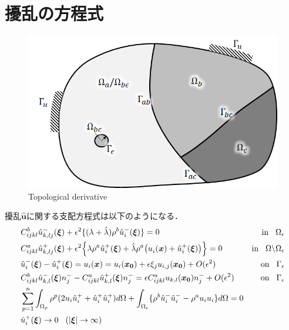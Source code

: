 \section{擾乱の方程式}

\begin{figure}[ht]
	\begin{center}
		\includegraphics{./figures/TDhole.png}
		\caption{Topological derivative}
		\label{fig:TD}
	\end{center}
\end{figure}

擾乱$\hat{\bm{u}}$に関する支配方程式は以下のようになる．
\begin{align}
&C_{ijkl}^{b} \hat{u}^{-}_{k,lj}(\bm{\xi})
+\epsilon^2\{(\lambda+\hat{\lambda})\rho^{b} \hat{u}_{i}^{-}(\bm{\xi})\}=0&\text{in}\hspace{0.3cm}\Omega_{\epsilon}
\label{eq:GovDisturIn}
\\
&C_{ijkl}^{a}\hat{u}^{+}_{k,lj}(\bm{\xi})
+\epsilon^2\Bigl \{\lambda\rho^{a} \hat{u}_{i}^{+}(\bm{\xi})
+\hat{\lambda}\rho^{a} \bigl(u_{i}^{}(\bm{x})+\hat{u}_{i}^{+}(\bm{\xi}) \bigr) \Bigr \}=0
&\text{in}\hspace{0.3cm}\Omega\backslash\Omega_{\epsilon}
\label{eq:GovDisturOut}
\\
&\hat{u}_{i}^{-}(\bm{\xi})-\hat{u}_{i}^{+}(\bm{\xi})=u_{i}(\bm{x})=u_{i}(\bm{x_0})+\epsilon \xi_j u_{i,j}(\bm{x_0})+O(\epsilon^2) &\text{on}\hspace{0.3cm}\Gamma_{\epsilon}
\label{eq:GovDisturUBC}
\\
&C_{ijkl}^{b}\hat{u}_{k,l}^{-}(\bm{\xi})n_{j}^{-}
-C_{ijkl}^{a}\hat{u}_{k,l}^{+}(\bm{\xi})n_{j}^{-}
=\epsilon C_{ijkl}^{a}u_{k,l}(\bm{x_0})n_{j}^{-}+O(\epsilon^2) &\text{on}\hspace{0.3cm}\Gamma_{\epsilon}
\label{eq:GovDisturSBC}
\\
&\sum_{p=1}^{n}\int_{\Omega_p}\rho^{p}(2u_{i}\hat{u}_{i}^{+}+\hat{u}_{i}^{+}\hat{u}_{i}^{+}) d\Omega
+\int_{\Omega_{\epsilon}}\{\rho^{b}\hat{u}_{i}^{-}\hat{u}_{i}^{-}-\rho^{a}u_{i}u_{i}\} d\Omega=0
\label{eq:GovDisturNorm}
\\
&\hat{u}_{i}^{+}(\bm{\xi})\rightarrow 0 \hspace{0.3cm} (|\bm{\xi}|\rightarrow \infty)
\label{eq:GovDisturInftyBC}
\end{align}

